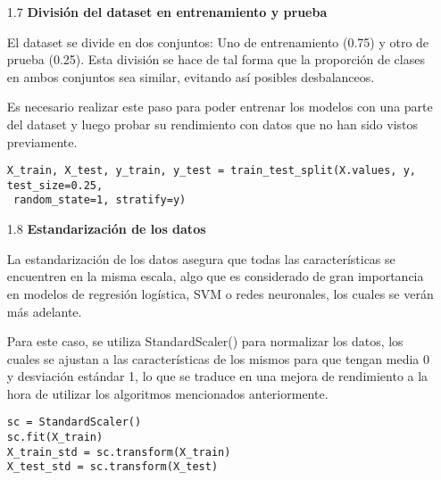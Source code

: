 \documentclass{article}
\begin{document}
\bigskip

\begin{itemize}

\item[1.7]  {\bf Divisi\'on del dataset en entrenamiento y prueba}

El dataset se divide en dos conjuntos: Uno de entrenamiento (0.75) y otro de prueba (0.25). Esta divisi\'on se hace de tal forma que la proporci\'on de clases en ambos conjuntos sea similar, evitando as\'i posibles desbalanceos.

Es necesario realizar este paso para poder entrenar los modelos con una parte del dataset y luego probar su rendimiento con datos que no han sido vistos previamente.

\begin{tcolorbox}[width=14cm]
\begin{scriptsize}
\begin{verbatim}
X_train, X_test, y_train, y_test = train_test_split(X.values, y, test_size=0.25,
 random_state=1, stratify=y)
\end{verbatim}
\end{scriptsize}
\end{tcolorbox}

\end{itemize}

\bigskip

\begin{itemize}

\item[1.8]  {\bf Estandarizaci\'on de los datos}

La estandarizaci\'on de los datos asegura que todas las caracter\'isticas se encuentren en la misma escala, algo que es considerado de gran importancia en modelos de regresi\'on log\'istica, SVM o redes neuronales, los cuales se ver\'an m\'as adelante.

Para este caso, se utiliza StandardScaler() para normalizar los datos, los cuales se ajustan a las caracter\'isticas de los mismos para que tengan media 0 y desviaci\'on est\'andar 1, lo que se traduce en una mejora de rendimiento a la hora de utilizar los algoritmos mencionados anteriormente.

\begin{tcolorbox}[width=14cm]
\begin{scriptsize}
\begin{verbatim}
sc = StandardScaler()
sc.fit(X_train)
X_train_std = sc.transform(X_train)
X_test_std = sc.transform(X_test)
\end{verbatim}
\end{scriptsize}
\end{tcolorbox}

\end{itemize}
\end{document}
